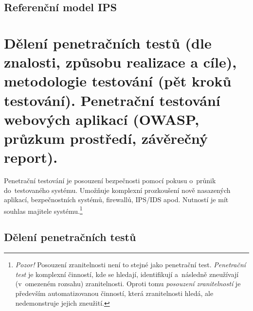 \subsection{Referenční model IPS}

\begin{figure}[ht]
\centering
{}
\end{figure}

\clearpage

\section{Dělení penetračních testů (dle znalosti, způsobu realizace a cíle), metodologie testování (pět kroků testování). Penetrační testování webových aplikací (OWASP, průzkum prostředí, závěrečný report).}

Penetrační testování je posouzení bezpečnosti pomocí pokusu o~průnik do~testovaného systému. Umožňuje komplexní prozkoušení nově nasazených aplikací, bezpečnostních systémů, firewallů, IPS/IDS apod. Nutností je mít souhlas majitele systému.\footnote{\textit{Pozor!} Posouzení zranitelnosti není to stejné jako penetrační test. \textit{Penetrační test} je komplexní činností, kde se hledají, identifikují a~následně zneužívají (v~omezeném rozsahu) zranitelnosti. Oproti tomu \textit{posouzení zranitelností} je především automatizovanou činností, která zranitelnosti hledá, ale nedemonstruje jejich zneužití.}

\subsection{Dělení penetračních testů}

